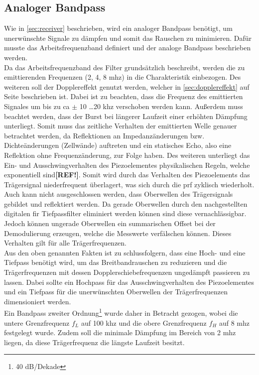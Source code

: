 \subsection{Analoger Bandpass}
Wie in \autoref{sec:receiver} beschrieben, wird ein analoger Bandpass benötigt, um unerwünschte Signale zu dämpfen und somit das Rauschen zu minimieren. Dafür musste das Arbeitsfrequenzband definiert und der analoge Bandpass beschrieben werden.\\
Da das Arbeitsfrequenzband des Filter grundsätzlich beschreibt, werden die zu emittierenden Frequenzen (2, 4, 8 \ac{mhz}) in die Charakteristik einbezogen. Des weiteren soll der Dopplereffekt genutzt werden, welcher in \autoref{sec:dopplereffekt} auf Seite \pageref{sec:dopplereffekt} beschrieben ist. Dabei ist zu beachten, dass die Frequenz des emittierten Signales um bis zu \ac{ca} $\pm$ 10 \ldots 20 \ac{khz} verschoben werden kann. Außerdem muss beachtet werden, dass der Burst bei längerer Laufzeit einer erhöhten Dämpfung unterliegt. Somit muss das zeitliche Verhalten der emittierten Welle genauer betrachtet werden, da Reflektionen an Impedanzänderungen bzw. Dichteänderungen (Zellwände) auftreten und ein statisches Echo, also eine Reflektion ohne Frequenzänderung, zur Folge haben. Des weiteren unterliegt das Ein- und Ausschwingverhalten des Piezoelementes physikalischen Regeln, welche exponentiell sind\textbf{[REF!]}. Somit wird durch das Verhalten des Piezoelements das Trägersignal niederfrequent überlagert, was sich durch die \ac{prf} zyklisch wiederholt. Auch kann nicht ausgeschlossen werden, dass Oberwellen des Trägersignals gebildet und reflektiert werden. Da gerade Oberwellen durch den nachgestellten digitalen \ac{fir} Tiefpassfilter eliminiert werden können sind diese vernachlässigbar. Jedoch können ungerade Oberwellen ein summarischen Offset bei der Demodulierung erzeugen, welche die Messwerte verfälschen können. Dieses Verhalten gilt für alle Trägerfrequenzen.\\
Aus den oben genannten Fakten ist zu schlussfolgern, dass eine Hoch- und eine Tiefpass benötigt wird, um das Breitbandrauschen zu reduzieren und die Trägerfrequenzen mit dessen Dopplerschiebefrequenzen ungedämpft passieren zu lassen. Dabei sollte ein Hochpass für das Ausschwingverhalten des Piezoelementes und ein Tiefpass für die unerwünschten Oberwellen der Trägerfrequenzen dimensioniert werden.\\
Ein Bandpass zweiter Ordnung\footnote{40 dB/Dekade} wurde daher in Betracht gezogen, wobei die untere Grenzfrequenz $f_L$ auf 100 \ac{khz} und die obere Grenzfrequenz $f_H$ auf 8 \ac{mhz} festgelegt wurde. Zudem soll die minimale Dämpfung im Bereich von 2 \ac{mhz} liegen, da diese Trägerfrequenz die längste Laufzeit besitzt.
